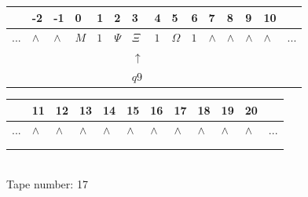 \documentclass[11pt]{article}
\begin{document}
\begin{table}[H]
\centering
\begin{tabular}{lllllllllllllll}
 & -2 & -1 & 0 & 1 & 2 & 3 & 4 & 5 & 6 & 7 & 8 & 9 & 10 & \\
\hline
$...$ & \multicolumn{1}{|l|}{$\wedge$} & \multicolumn{1}{|l|}{$\wedge$} & \multicolumn{1}{|l|}{$M$} & \multicolumn{1}{|l|}{$1$} & \multicolumn{1}{|l|}{$\Psi$} & \multicolumn{1}{|l|}{$\Xi$} & \multicolumn{1}{|l|}{$1$} & \multicolumn{1}{|l|}{$\Omega$} & \multicolumn{1}{|l|}{$1$} & \multicolumn{1}{|l|}{$\wedge$} & \multicolumn{1}{|l|}{$\wedge$} & \multicolumn{1}{|l|}{$\wedge$} & \multicolumn{1}{|l|}{$\wedge$} & $...$\\
\hline
&  &  &  &  &  & $\uparrow$ &  &  &  &  &  &  &  &  \\
&  &  &  &  &  & $ q9 $ &  &  &  &  &  &  &  &  \\
\end{tabular}
\begin{tabular}{llllllllllll}
 & 11 & 12 & 13 & 14 & 15 & 16 & 17 & 18 & 19 & 20 & \\
\hline
$...$ & \multicolumn{1}{|l|}{$\wedge$} & \multicolumn{1}{|l|}{$\wedge$} & \multicolumn{1}{|l|}{$\wedge$} & \multicolumn{1}{|l|}{$\wedge$} & \multicolumn{1}{|l|}{$\wedge$} & \multicolumn{1}{|l|}{$\wedge$} & \multicolumn{1}{|l|}{$\wedge$} & \multicolumn{1}{|l|}{$\wedge$} & \multicolumn{1}{|l|}{$\wedge$} & \multicolumn{1}{|l|}{$\wedge$} & $...$\\
\hline
&  &  &  &  &  &  &  &  &  &  &  \\
&  &  &  &  &  &  &  &  &  &  &  \\
\end{tabular}
\\
Tape number: 17
\noindent\makebox[\linewidth]{\hdashrule{\textwidth}{1pt}{1pt}}\end{table}
\end{document}
